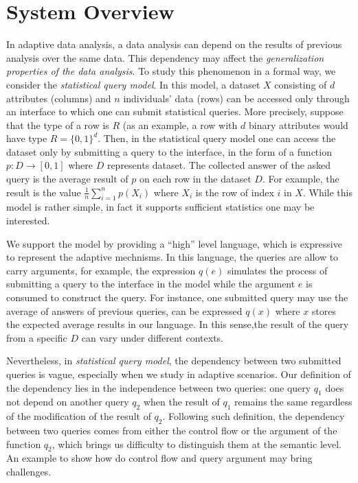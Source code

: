 \documentclass[a4paper,11pt]{article}
\begin{document}
\section{System Overview}
In adaptive data analysis, a data analysis can depend on the results of
previous analysis over the same data. This dependency may affect the
\emph{generalization properties of the data analysis}. To study this phenomenon
in a formal way, we consider the \emph{statistical query
  model}. In this model, a dataset $X$ consisting of $d$ attributes (columns) and $n$
individuals' data (rows) can be accessed only through an interface to
which one can submit statistical queries. More precisely, suppose that
the type of a row is $R$ (as an example, a row with $d$ binary
attributes would have type $R=\{0,1\}^d$. Then, in the statistical
query model one can access the dataset only by submitting a query to
the interface, in
the form of a function
$p:D\to [0,1] $ where $D$ represents dataset. The collected answer of
the asked query is the average result of $p$ on each row in the
dataset $D$. For example, the result is the
value $\frac{1}{n}\sum_{i=1}^n p(X_i)$ where
$X_i$ is the row of index $i$ in $X$. While this model is rather
simple, in fact it supports sufficient statistics one may be
interested.

We support the model by providing a ``high'' level language, which is
expressive to represent the adaptive mechnisms. In this language, the
queries are allow to carry arguments, for example, the expression
$q(e)$ simulates the process of submitting a query to the interface in
the model while the argument $e$ is consumed to construct the
query. For instance, one submitted query may use the average of
answers of previous queries, can be expressed $q(x)$ where $x$ stores
the expected average results in our language. In this sense,the result of the query from a specific $D$ can vary under different contexts.

Nevertheless, in \emph{statistical query
  model}, the dependency between two submitted queries is vague, especially when
we study in adaptive scenarios. Our definition of the dependency lies
in the independence between two queries: one query
$q_1$ does not
depend on another query $q_2$ when the result of $q_1$ remains the
same regardless of the modification of the result of $q_2$. Following such
definition, the dependency between two queries comes from either the
control flow or the argument of the function $q_2$, which brings us
difficulty to distinguish them at the semantic level. \\
{An example to show how do control flow and query argument may bring challenges}.
\end{document}
